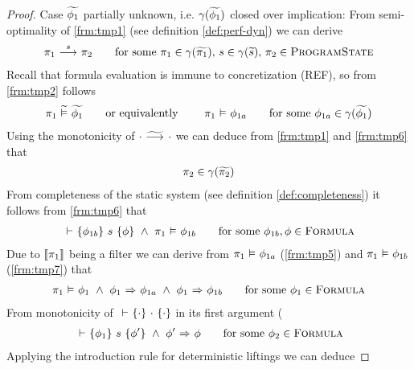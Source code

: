 \begin{proof}
    Case $\widetilde{\phi_1}$ partially unknown, i.e. $\gamma(\widetilde{\phi_1})$ closed over implication:
        From semi-optimality of \ref{frm:tmp1} (see definition \ref{def:perf-dyn}) we can derive
        \begin{align}
        \label{frm:tmp6}
        \sstepConsume{s}{\pi_1}{\pi_2}
        \quad\quad\text{for some } \pi_1 \in \gamma(\grad{\pi_1}),\, s \in \gamma(\grad{s}),\, \pi_2 \in \setProgramState
        \end{align}
        Recall that formula evaluation is immune to concretization (REF), so from \ref{frm:tmp2} follows
        \begin{align}
        \label{frm:tmp5}
        \evalgphiGen{\pi_1}{\grad{\phi_1}}
        \text{\quad\quad or equivalently \quad\quad}
        \evalphiGen{\pi_1}{\phi_{1a}}
        \quad\quad\text{for some } \phi_{1a} \in \gamma(\grad{\phi_1}) 
        \end{align}
        Using the monotonicity of ${\cdot} \,\,{\widetilde{\longrightarrow}^{}}\,\, {\cdot}$ we can deduce from \ref{frm:tmp1} and \ref{frm:tmp6} that
        \begin{align}
        \label{frm:tmp6x}
        \pi_2 \in \gamma(\grad{\pi_2})
        \end{align}
        From completeness of the static system (see definition \ref{def:completeness}) it follows from \ref{frm:tmp6} that
        \begin{align}
        \label{frm:tmp7}
        \thoare{}{\phi_{1b}}{s}{\phi} ~\wedge~ \evalphiGen{\pi_1}{\phi_{1b}}
        \quad\quad\text{for some } \phi_{1b}, \phi \in \setFormula
        \end{align}
        Due to $\llbracket {\pi_1} \rrbracket$ being a filter we can derive from $\pi_1 \,\,{\vDash}\,\, \phi_{1a}$ (\ref{frm:tmp5}) and $\pi_1 \,\,{\vDash}\,\, \phi_{1b}$ (\ref{frm:tmp7}) that
        \begin{align}
        \label{frm:tmp8}
        \evalphiGen{\pi_1}{\phi_1} ~\wedge~ \phiImplies{\phi_1}{\phi_{1a}} ~\wedge~ \phiImplies{\phi_1}{\phi_{1b}}
        \quad\quad\text{for some } \phi_1 \in \setFormula
        \end{align}
        From monotonicity of ${} \,\,{\vdash}\,\, \{{\cdot}\} ~{\cdot}~ \{{\cdot}\}$ in its first argument (%
        \begin{align}
        \label{frm:tmp9}
        \thoare{}{\phi_1}{s}{\phi'} ~\wedge~ \phiImplies{\phi'}{\phi}
        \quad\quad\text{for some } \phi_2 \in \setFormula
        \end{align}
        Applying the introduction rule for deterministic liftings we can deduce

\end{proof}
